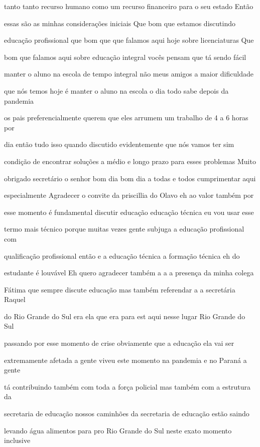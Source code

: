 \documentclass[a4paper,12pt]{article}
\begin{document}
tanto tanto recurso humano como um recurso financeiro para o seu estado Então

essas são as minhas considerações iniciais Que bom que estamos discutindo

educação profissional que bom que que falamos aqui hoje sobre licenciaturas Que

bom que falamos aqui sobre educação integral vocês pensam que tá sendo fácil

manter o aluno na escola de tempo integral não meus amigos a maior dificuldade

que nós temos hoje é manter o aluno na escola o dia todo sabe depois da pandemia

os pais preferencialmente querem que eles arrumem um trabalho de 4 a 6 horas por

dia então tudo isso quando discutido evidentemente que nós vamos ter sim

condição de encontrar soluções a médio e longo prazo para esses problemas Muito

obrigado secretário o senhor bom dia bom dia a todas e todos cumprimentar aqui

especialmente Agradecer o convite da priscillia do Olavo eh ao valor também por

esse momento é fundamental discutir educação educação técnica eu vou usar esse

termo mais técnico porque muitas vezes gente subjuga a educação profissional com

qualificação profissional então e a educação técnica a formação técnica eh do

estudante é louvável Eh quero agradecer também a a a presença da minha colega

Fátima que sempre discute educação mas também referendar a a secretária Raquel

do Rio Grande do Sul era ela que era para est aqui nesse lugar Rio Grande do Sul

passando por esse momento de crise obviamente que a educação ela vai ser

extremamente afetada a gente viveu este momento na pandemia e no Paraná a gente

tá contribuindo também com toda a força policial mas também com a estrutura da

secretaria de educação nossos caminhões da secretaria de educação estão saindo

levando água alimentos para pro Rio Grande do Sul neste exato momento inclusive
\end{document}
